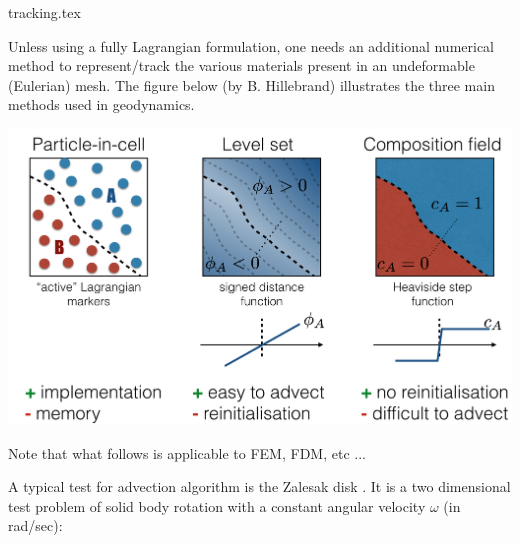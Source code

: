 \begin{flushright} {\tiny {\color{gray} tracking.tex}} \end{flushright}

Unless using a fully Lagrangian formulation, one needs an additional numerical method to represent/track
the various materials present in an undeformable (Eulerian) mesh.
The figure below (by B. Hillebrand) illustrates the three main methods used in geodynamics.

\begin{center}
\includegraphics[width=15cm]{images/tracking/tracking}
\end{center}

Note that what follows is applicable to FEM, FDM, etc ...


A typical test for advection algorithm is the Zalesak disk \cite{zale79}. It is a two dimensional test 
problem of solid body rotation with a constant angular velocity $\omega$ (in rad/sec):


